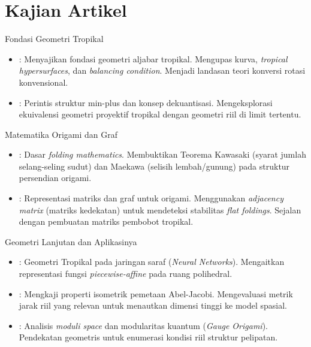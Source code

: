 \documentclass[aspectratio=169]{beamer}
\begin{document}
\section{Kajian Artikel}
\begin{frame}{Fondasi Geometri Tropikal}
  \begin{itemize}
    \item \parencite{maclagan2015tropical}: Menyajikan fondasi geometri aljabar tropikal. Mengupas kurva, \textit{tropical hypersurfaces}, dan \textit{balancing condition}. Menjadi landasan teori konversi rotasi konvensional.
    \item \parencite{mikhalkin2006tropical}: Perintis struktur min-plus dan konsep dekuantisasi. Mengeksplorasi ekuivalensi geometri proyektif tropikal dengan geometri riil di limit tertentu.
  \end{itemize}
\end{frame}

\begin{frame}{Matematika Origami dan Graf}
  \begin{itemize}
    \item \parencite{hull2012project}: Dasar \textit{folding mathematics}. Membuktikan Teorema Kawasaki (syarat jumlah selang-seling sudut) dan Maekawa (selisih lembah/gunung) pada struktur persendian origami.
    \item \parencite{ku2014realization}: Representasi matriks dan graf untuk origami. Menggunakan \textit{adjacency matrix} (matriks kedekatan) untuk mendeteksi stabilitas \textit{flat foldings}. Sejalan dengan pembuatan matriks pembobot tropikal.
  \end{itemize}
\end{frame}

\begin{frame}{Geometri Lanjutan dan Aplikasinya}
  \begin{itemize}
    \item \parencite{zhang2018tropical}: Geometri Tropikal pada jaringan saraf (\textit{Neural Networks}). Mengaitkan representasi fungsi \textit{piecewise-affine} pada ruang polihedral.
    \item \parencite{foster2020metric}: Mengkaji properti isometrik pemetaan Abel-Jacobi. Mengevaluasi metrik jarak riil yang relevan untuk menautkan dimensi tinggi ke model spasial.
    \item \parencite{gk2021origami,nekrasov2018geometry}: Analisis \textit{moduli space} dan modularitas kuantum (\textit{Gauge Origami}). Pendekatan geometris untuk enumerasi kondisi riil struktur pelipatan.
  \end{itemize}
\end{frame}
\end{document}
